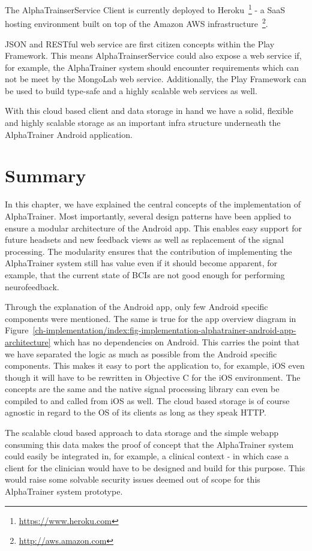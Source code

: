 \documentclass[a4paper,10pt,english,lof,lot,twoside]{puthesis}
\begin{document}
The AlphaTrainserService Client is currently deployed to Heroku \footnote{
\href{https://www.heroku.com}{https://www.heroku.com}
} - a SaaS hosting environment built on top of the
Amazon AWS infrastructure \footnote{
\href{http://aws.amazon.com}{http://aws.amazon.com}
}.

JSON and RESTful web service are first citizen concepts within the Play
Framework. This means AlphaTrainserService could also expose a web service if,
for example, the AlphaTrainer system should encounter requirements which can not
be meet by the MongoLab web service. Additionally, the Play Framework can be
used to build type-safe and a highly scalable web services as well.

With this cloud based client and data storage in hand we have a solid, flexible
and highly scalable storage as an important infra structure underneath the
AlphaTrainer Android application.


\section{Summary}
\label{ch-implementation/index:summary}
In this chapter, we have explained the central concepts of the implementation
of AlphaTrainer. Most importantly, several design patterns have been applied
to ensure a modular architecture of the Android app. This enables easy support for
future headsets and new feedback views as well as replacement of the signal
processing. The modularity ensures that the contribution of implementing the
AlphaTrainer system still has value even if it should become apparent, for example,
that the current state of BCIs are not good enough for performing neurofeedback.

Through the explanation of the Android app, only few Android specific components
were mentioned. The same is true for the app overview diagram in
Figure \ref{ch-implementation/index:fig-implementation-alphatrainer-android-app-architecture} which
has no dependencies on Android. This carries the point that we
have separated the logic as much as possible from the Android specific components.
This makes it easy to port the application to, for example, iOS even though it
will have to be rewritten in Objective C for the iOS environment.
The concepts are the same and the native signal processing library
can even be compiled to and called from iOS as well. The cloud based storage
is of course agnostic in regard to the OS of its clients as long as they speak HTTP.

The scalable cloud based approach to data storage and the simple webapp consuming this
data makes the proof of concept that the AlphaTrainer system could easily be integrated in,
for example, a
clinical context - in which case a client for the clinician would have to be designed and build
for this purpose. This would raise some solvable security issues deemed out of scope for this
AlphaTrainer system prototype.
\end{document}
